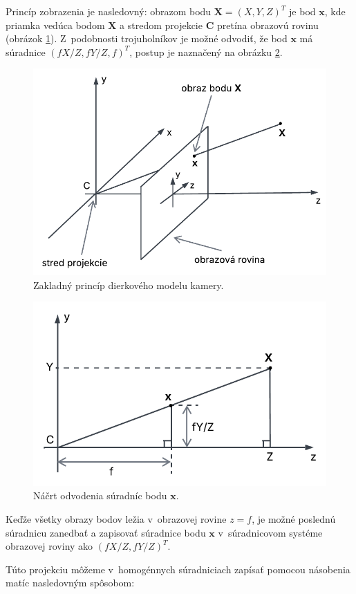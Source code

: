Princíp zobrazenia je nasledovný: obrazom bodu $\mathbf{X} = (X, Y, Z)^T$ je bod $\mathbf{x}$, kde priamka vedúca bodom $\mathbf{X}$ a stredom projekcie $\mathbf{C}$ pretína obrazovú rovinu (obrázok \ref{fig:model_kamery1}). Z~podobnosti trojuholníkov je možné odvodiť, že bod $\mathbf{x}$ má súradnice $(fX/Z, fY/Z, f)^T$, postup je naznačený na obrázku \ref{fig:model_kamery2}.

\begin{figure}[h!]
    \centering
    \includegraphics[width=0.7\linewidth]{text_prace/obrazky-figures/model_kamery1.pdf}
    \caption{Zakladný princíp dierkového modelu kamery.}
    \label{fig:model_kamery1}
\end{figure}

\begin{figure}[h!]
    \centering
    \includegraphics[width=0.7\linewidth]{text_prace/obrazky-figures/model_kamery2.pdf}
    \caption{Náčrt odvodenia súradníc bodu $\mathbf{x}$.}
    \label{fig:model_kamery2}
\end{figure}

Keďže všetky obrazy bodov ležia v~obrazovej rovine $z = f$, je možné poslednú súradnicu zanedbať a zapisovať súradnice bodu $\mathbf{x}$ v~súradnicovom systéme obrazovej roviny ako $(fX/Z, fY/Z)^T$.

Túto projekciu môžeme v~homogénnych súradniciach zapísať pomocou násobenia matíc nasledovným spôsobom:

